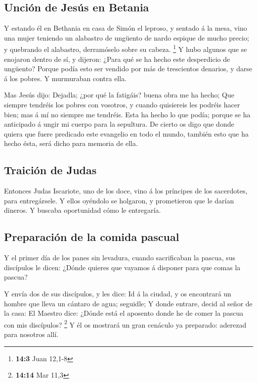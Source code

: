 \hypertarget{unciuxf3n-de-jesuxfas-en-betania}{%
\subsection{Unción de Jesús en
Betania}\label{unciuxf3n-de-jesuxfas-en-betania}}

 Y estando él en Bethania en casa de Simón el leproso, y
sentado á la mesa, vino una mujer teniendo un alabastro de ungüento de
nardo espique de mucho precio; y quebrando el alabastro, derramóselo
sobre su cabeza. \footnote{\textbf{14:3} Juan 12,1-8}  Y
hubo algunos que se enojaron dentro de sí, y dijeron: ¿Para qué se ha
hecho este desperdicio de ungüento?  Porque podía esto ser
vendido por más de trescientos denarios, y darse á los pobres. Y
murmuraban contra ella.

 Mas Jesús dijo: Dejadla; ¿por qué la fatigáis? buena obra
me ha hecho;  Que siempre tendréis los pobres con
vosotros, y cuando quisiereis les podréis hacer bien; mas á mí no
siempre me tendréis.  Esta ha hecho lo que podía; porque
se ha anticipado á ungir mi cuerpo para la sepultura.  De
cierto os digo que donde quiera que fuere predicado este evangelio en
todo el mundo, también esto que ha hecho ésta, será dicho para memoria
de ella.

\hypertarget{traiciuxf3n-de-judas}{%
\subsection{Traición de Judas}\label{traiciuxf3n-de-judas}}

 Entonces Judas Iscariote, uno de los doce, vino á los
príncipes de los sacerdotes, para entregársele.  Y ellos
oyéndolo se holgaron, y prometieron que le darían dineros. Y buscaba
oportunidad cómo le entregaría.

\hypertarget{preparaciuxf3n-de-la-comida-pascual}{%
\subsection{Preparación de la comida
pascual}\label{preparaciuxf3n-de-la-comida-pascual}}

 Y el primer día de los panes sin levadura, cuando
sacrificaban la pascua, sus discípulos le dicen: ¿Dónde quieres que
vayamos á disponer para que comas la pascua?

 Y envía dos de sus discípulos, y les dice: Id á la
ciudad, y os encontrará un hombre que lleva un cántaro de agua;
seguidle;  Y donde entrare, decid al señor de la casa: El
Maestro dice: ¿Dónde está el aposento donde he de comer la pascua con
mis discípulos? \footnote{\textbf{14:14} Mar 11,3}  Y él
os mostrará un gran cenáculo ya preparado: aderezad para nosotros allí.

